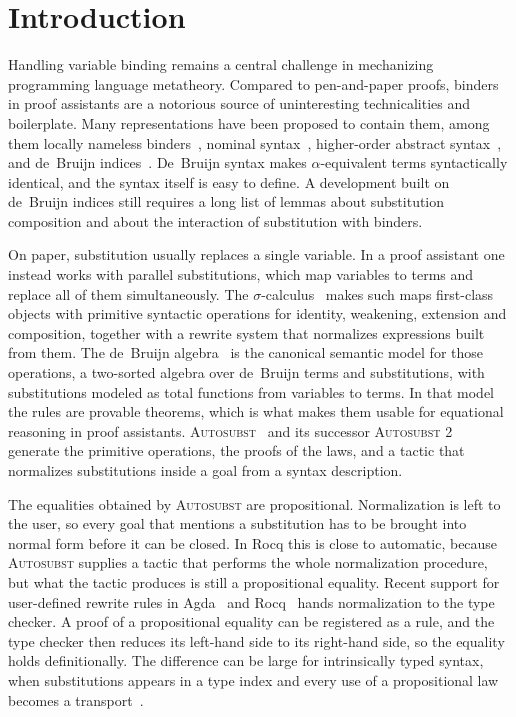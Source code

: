 \documentclass[sigplan,anonymous,review]{acmart}
\theoremstyle{acmdefinition}
\begin{document}
\section{Introduction}\label{sec:introduction}

Handling variable binding remains a central challenge in mechanizing
programming language metatheory. Compared to pen-and-paper proofs, binders in
proof assistants are a notorious source of uninteresting technicalities and
boilerplate. Many representations have been proposed to contain them, among
them locally nameless binders~\cite{Chargueraud2012}, nominal
syntax~\cite{10.1007/11532231_4, Nominal2-AFP}, higher-order abstract
syntax~\cite{PfenningElliott1988}, and de~Bruijn indices~\cite{deBruijn1972}.
De~Bruijn syntax makes $α$-equivalent terms syntactically identical, and the
syntax itself is easy to define. A development built on de~Bruijn indices still
requires a long list of lemmas about substitution composition and about the
interaction of substitution with binders.

On paper, substitution usually replaces a single variable. In a proof assistant
one instead works with parallel substitutions, which map variables to terms and
replace all of them simultaneously. The $σ$-calculus~\cite{10.1145/96709.96712}
makes such maps first-class objects with primitive syntactic operations for
identity, weakening, extension and composition, together with a rewrite system
that normalizes expressions built from them. The de~Bruijn
algebra~\cite{10.1145/2676724.2693163} is the canonical semantic model for
those operations, a two-sorted algebra over de~Bruijn terms and substitutions,
with substitutions modeled as total functions from variables to terms. In that
model the rules are provable theorems, which is what makes them usable for
equational reasoning in proof assistants.
\textsc{Autosubst}~\cite{schafer2015autosubst} and its successor
\textsc{Autosubst 2}~\cite{10.1145/3293880.3294101} generate the primitive
operations, the proofs of the laws, and a tactic that normalizes substitutions
inside a goal from a syntax description.

The equalities obtained by \textsc{Autosubst} are propositional. Normalization
is left to the user, so every goal that mentions a substitution has to be
brought into normal form before it can be closed. In Rocq this is close to
automatic, because \textsc{Autosubst} supplies a tactic that performs the whole
normalization procedure, but what the tactic produces is still a propositional
equality. Recent support for user-defined rewrite rules in
Agda~\cite{cockx:LIPIcs.TYPES.2019.2, 10.1145/3434341} and
Rocq~\cite{leray_et_al:LIPIcs.ITP.2024.26} hands normalization to the type
checker. A proof of a propositional equality can be registered as a rule, and
the type checker then reduces its left-hand side to its right-hand side, so the
equality holds definitionally. The difference can be large for intrinsically
typed syntax, when substitutions appears in a type index and every use of a
propositional law becomes a transport~\cite{stronglytyped}.
\end{document}
